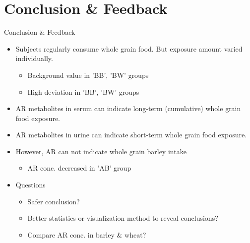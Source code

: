 \documentclass{beamer}
\begin{document}
\section{Conclusion \& Feedback}
\begin{frame}{Conclusion \& Feedback}
\begin{itemize}
	\item Subjects regularly consume whole grain food. But exposure amount varied individually.
	\begin{itemize}
		\item Background value in 'BB', 'BW' groups	
		\item High deviation in 'BB', 'BW' groups
	\end{itemize}

	\item AR metabolites in serum can indicate long-term (cumulative) whole grain food exposure.
	\item AR metabolites in urine can indicate short-term whole grain food exposure.
	\item However, AR can not indicate whole grain barley intake
		\begin{itemize}
		\item AR conc. decreased in 'AB' group
		\end{itemize}
	
	\item Questions
	\begin{itemize}
		\item Safer conclusion?
		\item Better statistics or visualization method to reveal conclusions?
		\item Compare AR conc. in barley \& wheat?
	\end{itemize}

	
	
\end{itemize}

\end{frame}
\end{document}
